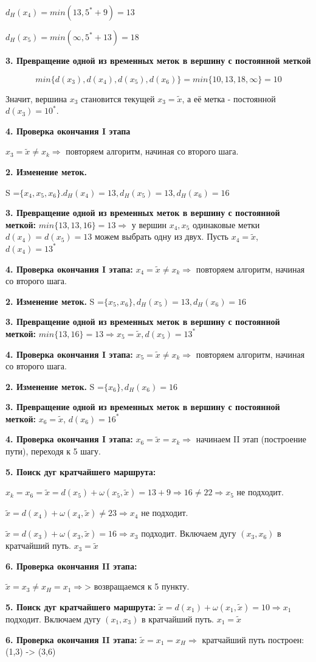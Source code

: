 \documentclass[12pt, a4paper, oneside]{article}
\theoremstyle{plain} %
\theoremstyle{definition}
\begin{document}
$d_H(x_4) = min(13, 5^* + 9 ) = 13$

$d_H(x_5) = min(\infty, 5^* + 13 ) = 18$

\textbf{3. Превращение одной из временных меток в вершину с постоянной меткой }

\[ min\{d(x_3),d(x_4),d(x_5),d(x_6)\} = min\{10,13,18,\infty\} = 10 \]

Значит, вершина $x_3$ становится текущей $x_3 = \tilde x$, а её метка - постоянной $d(x_3) = 10^*$.

\textbf{4. Проверка окончания I этапа }

$x_3 = \tilde x \neq x_k \Rightarrow$ повторяем алгоритм, начиная со второго шага.

\textbf{2. Изменение меток.} 

S =$\{ x_4, x_5, x_6 \}. d_H(x_4) = 13, d_H(x_5) = 13, d_H(x_6) = 16$

\textbf{3. Превращение одной из временных меток в вершину с постоянной меткой: }
$min\{13,13,16\} = 13 \Rightarrow$ у вершин $x_4, x_5$ одинаковые метки $d(x_4)=d(x_5)=13$ можем выбрать одну из двух. Пусть $x_4 = \tilde x$, $d(x_4) = 13^*$

\textbf{4. Проверка окончания I этапа: } $x_4 = \tilde x \neq x_k \Rightarrow$ повторяем алгоритм, начиная со второго шага.

\textbf{2. Изменение меток.} S =$\{x_5, x_6 \}, d_H(x_5) = 13, d_H(x_6) = 16$

\textbf{3. Превращение одной из временных меток в вершину с постоянной меткой: } $min\{13,16\} = 13 \Rightarrow x_5 = \tilde x, d(x_5) = 13^*$

\textbf{4. Проверка окончания I этапа: } $x_5 = \tilde x \neq x_k \Rightarrow$ повторяем алгоритм, начиная со второго шага.

\textbf{2. Изменение меток.} S =$\{x_6 \},  d_H(x_6) = 16$

\textbf{3. Превращение одной из временных меток в вершину с постоянной меткой: } $x_6 = \tilde x$, $d(x_6) = 16^*$

\textbf{4. Проверка окончания I этапа: } $x_6 = \tilde x = x_k \Rightarrow$ начинаем II этап (построение пути), переходя к 5 шагу.

\textbf{5. Поиск дуг кратчайшего маршрута: }

$ x_k = x_6 = \tilde x = d(x_5) + \omega(x_5, \tilde x ) = 13 + 9 \Rightarrow 16 \neq 22 \Rightarrow x_5$ не подходит.

$\tilde x = d(x_4) + \omega(x_4, \tilde x ) \neq 23 \Rightarrow x_4$ не подходит.

$\tilde x = d(x_3) + \omega(x_3, \tilde x ) = 16 \Rightarrow x_3$ подходит. Включаем дугу $(x_3,x_6)$ в кратчайший путь. $x_3 = \tilde x$

\textbf{6. Проверка окончания II этапа: }

$\tilde x = x_3 \neq x_H = x_1 \Rightarrow$> возвращаемся к 5 пункту.

\textbf{5. Поиск дуг кратчайшего маршрута: } $\tilde x = d(x_1) + \omega(x_1, \tilde x ) = 10 \Rightarrow x_1$ подходит. Включаем дугу $(x_1,x_3)$ в кратчайший путь. $x_1 = \tilde x$

\textbf{6. Проверка окончания II этапа: } $\tilde x = x_1 = x_H \Rightarrow$ кратчайший путь построен: (1,3) -> (3,6)
\end{document}
